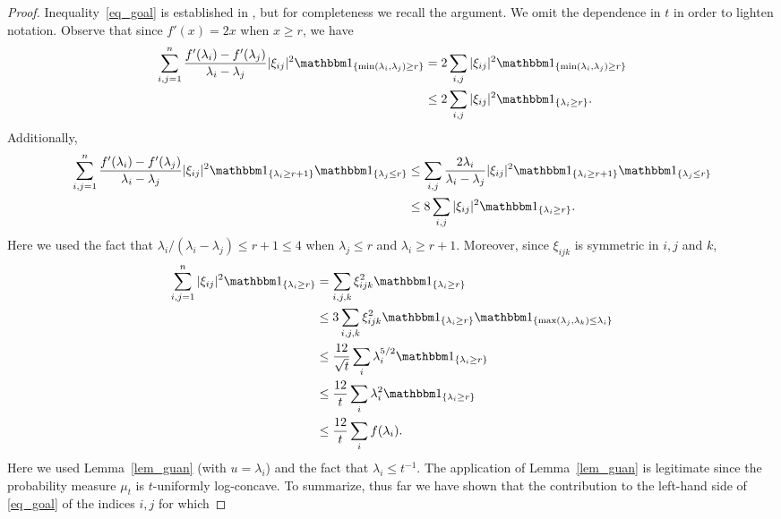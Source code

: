 \documentclass[12pt,a4paper]{article}
\theoremstyle{definition}
\begin{document}
\begin{proof}
\medskip Inequality~\eqref{eq_goal} is established in \cite{guan},
but for completeness we recall the argument. We omit the dependence
in $t$ in order to lighten notation.
Observe  that since $f'(x) = 2x$ when $x \geq r$, we have
\[
\begin{split}
\sum_{i,j=1}^n \frac{ f'(\lambda_i)-f'(\lambda_j) }{ \lambda_i -\lambda_j }
|\xi_{ij}|^2 \mathbbm  1_{\{ \min ( \lambda_i, \lambda_j ) \geq r   \} }
& = 2 \sum_{i,j} \vert \xi_{ij}\vert^2
 \mathbbm  1_{\{ \min ( \lambda_i , \lambda_j ) \geq r \} } \\
 & \leq 2 \sum_{i,j} \vert \xi_{ij}\vert^2 \mathbbm 1_{\{\lambda_i \geq r \}} .
\end{split}
\]
Additionally, 
\[
\begin{split}
\sum_{i,j=1}^n \frac{ f'(\lambda_i)-f'(\lambda_j) }{ \lambda_i -\lambda_j }
|\xi_{ij}|^2 \mathbbm  1_{\{ \lambda_i \geq r+1\}} \mathbbm 1_{\{ \lambda_j \leq r \} }
& \leq \sum_{i,j} \frac{ 2\lambda_i  }{ \lambda_i - \lambda_j }  \vert \xi_{ij} \vert^2
\mathbbm  1_{\{ \lambda_i \geq r+1\}} \mathbbm 1_{\{ \lambda_j \leq r \} }  \\
& \leq 8 \sum_{i, j} \vert\xi_{ij} \vert^2  \mathbbm 1_{\{ \lambda_i \geq r \} }.
\end{split}
\]
Here we  used the fact that $\lambda_i/(\lambda_i-\lambda_j) \leq r+1\leq 4$ when $\lambda_j \leq r$ and $\lambda_i \geq r+1$.
Moreover, since  $\xi_{ijk}$ is symmetric in $i,j$ and $k$, 
\[
\begin{split}
\sum_{i,j=1}^n \vert \xi_{ij} \vert^2  \mathbbm  1_{\{ \lambda_i \geq r \} }
& =  \sum_{i,j,k}  \xi_{ijk}^2  \mathbbm  1_{\{ \lambda_i \geq r \} } \\
& \leq 3   \sum_{i,j,k}  \xi_{ijk}^2  \mathbbm  1_{\{ \lambda_i \geq r \} } \mathbbm 1_{\{\max(\lambda_j , \lambda_k) \leq \lambda_i \}} \\
& \leq \frac{12}{\sqrt t} \sum_{i} \lambda_i^{5/2}
\mathbbm  1_{\{ \lambda_i \geq r \} } \\
& \leq \frac{12}{t} \sum_i \lambda_i^2  \mathbbm  1_{\{ \lambda_i \geq r \} } \\
& \leq \frac {12}t \sum_i f( \lambda_i ) .
\end{split}
\]
Here we used Lemma~\ref{lem_guan} (with $u=\lambda_i$)
and the fact that $\lambda_i \leq t^{-1}$. The application of 
Lemma~\ref{lem_guan} is legitimate since the probability measure $\mu_t$ is $t$-uniformly log-concave.
To summarize, thus far we have shown that the contribution to the left-hand side of \eqref{eq_goal}
of the indices $i,j$ for which

\end{proof}
\end{document}
